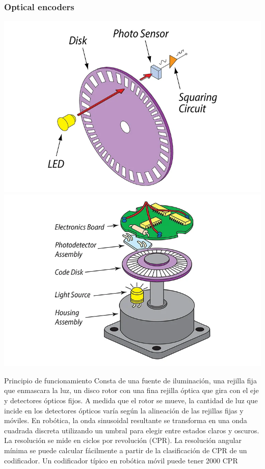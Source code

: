 \begin{frame}
    \frametitle{Optical encoders}
    \scriptsize
    \includegraphics[width=0.45\columnwidth]{images/encoder_principle}
    \includegraphics[width=0.46\columnwidth]{images/encoder_parts}
    \footnotesize

    \begin{block}{Principio de funcionamiento}
        Consta de una fuente de iluminación, una rejilla fija que enmascara la luz, un disco rotor con una fina rejilla óptica que gira con el eje y detectores ópticos fijos. A medida que el rotor se mueve, la cantidad de luz que incide en los detectores ópticos varía según la alineación de las rejillas fijas y móviles. En robótica, la onda sinusoidal resultante se transforma en una onda cuadrada discreta utilizando un umbral para elegir entre estados claros y oscuros. La resolución se mide en ciclos por revolución (CPR). La resolución angular mínima se puede calcular fácilmente a partir de la clasificación de CPR de un codificador. Un codificador típico en robótica móvil puede tener 2000 CPR
    \end{block}
\end{frame}

